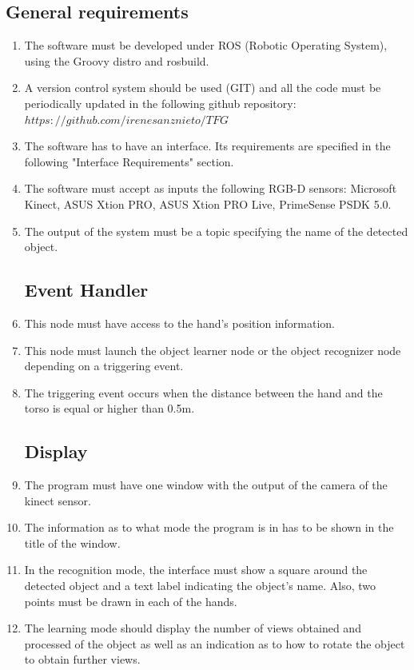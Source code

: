 \documentclass{article}
\makeatletter
\def\threedigits#1{\expandafter\@threedigits\csname c@#1\endcsname}
\def\@threedigits#1{%
  \ifnum#1<100 0\fi
  \ifnum#1<10 0\fi
  \number#1}
\makeatother
\begin{document}
\subsection{General requirements}
\begin{enumerate}[label=\textbf{FR\threedigits*}, leftmargin=2cm]

	\item The software must be developed under ROS (Robotic Operating System), using the Groovy distro and rosbuild.
	\item A version control system should be used (GIT) and all the code must be periodically updated in the following github repository:  $https://github.com/irenesanznieto/TFG$
	\item The software has to have an interface. Its requirements are specified in the following "Interface Requirements" section. 
	\item The software must accept as inputs the following RGB-D sensors: Microsoft Kinect, ASUS Xtion PRO, ASUS Xtion PRO Live, PrimeSense PSDK 5.0.
	\item The output of the system must be a topic specifying the name of the detected object. 
 
\subsection{Event Handler}
\item This node must have access to the hand's position information. 
\item This node must launch the object learner node or the object recognizer node depending on a triggering event. 
\item The triggering event occurs when the distance between the hand and the torso is equal or higher than 0.5m.   
 
\subsection{Display}

\item The program must have one window with the output of the camera of the kinect sensor. 
\item The information as to what mode the program is in has to be shown in the title of the window.
\item In the recognition mode, the interface must show a square around the detected object and a text label indicating the object's name. Also, two points must be drawn in each of the hands. 
\item The learning mode should display the number of views obtained and processed of the object as well as an indication as to how to rotate the object to obtain further views. 



\end{enumerate}
\end{document}
